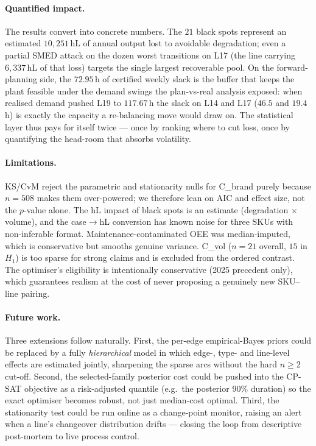 \documentclass[11pt,a4paper]{article}
\begin{document}
\paragraph{Quantified impact.}
The results convert into concrete numbers. The $21$ black spots represent an
estimated $10{,}251$\,hL of annual output lost to avoidable degradation; even a
partial SMED attack on the dozen worst transitions on L17 (the line carrying
$6{,}337$\,hL of that loss) targets the single largest recoverable pool. On the
forward-planning side, the $72.95$\,h of certified weekly slack is the buffer that
keeps the plant feasible under the demand swings the plan-vs-real analysis
exposed: when realised demand pushed L19 to $117.67$\,h the slack on L14 and L17
($46.5$ and $19.4$\,h) is exactly the capacity a re-balancing move would draw on.
The statistical layer thus pays for itself twice --- once by ranking where to cut
loss, once by quantifying the head-room that absorbs volatility.

\paragraph{Limitations.}
KS/CvM reject the parametric and stationarity nulls for C\_brand purely because
$n=508$ makes them over-powered; we therefore lean on AIC and effect size, not the
$p$-value alone. The hL impact of black spots is an estimate (degradation $\times$
volume), and the case$\rightarrow$hL conversion has known noise for three SKUs with
non-inferable format. Maintenance-contaminated OEE was median-imputed, which is
conservative but smooths genuine variance. C\_vol ($n=21$ overall, $15$ in $H_1$)
is too sparse for strong claims and is excluded from the ordered contrast. The
optimiser's eligibility is intentionally conservative (2025 precedent only), which
guarantees realism at the cost of never proposing a genuinely new SKU--line pairing.

\paragraph{Future work.}
Three extensions follow naturally. First, the per-edge empirical-Bayes priors could
be replaced by a fully \emph{hierarchical} model in which edge-, type- and
line-level effects are estimated jointly, sharpening the sparse arcs without the
hard $n\ge2$ cut-off. Second, the selected-family posterior cost could be pushed
into the CP-SAT objective as a risk-adjusted quantile (e.g.\ the posterior
$90\%$ duration) so the exact optimiser becomes robust, not just median-cost
optimal. Third, the
stationarity test could be run online as a change-point monitor, raising an alert
when a line's changeover distribution drifts --- closing the loop from descriptive
post-mortem to live process control.
\end{document}
